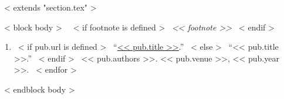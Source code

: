 ~< extends "section.tex" >~

~< block body >~
  ~< if footnote is defined >~
   {\scriptsize \emph{<< footnote >>} }
  ~< endif >~
  \begin{enumerate}
    ~< for pub in items >~
      \item{
        ~< if pub.url is defined >~
          ``\href{<< pub.url >>}{<< pub.title >>}.''
        ~< else >~
          ``<< pub.title >>.''
        ~< endif >~
        << pub.authors >>.
        << pub.venue >>,
        << pub.year >>.
      }
    ~< endfor >~
  \end{enumerate}
~< endblock body >~
